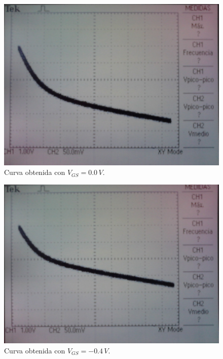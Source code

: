 \documentclass[10pt,spanish,a4paper,notitlepage]{article}
\begin{document}
\begin{figure}[H]
\centering
\includegraphics[scale=0.12]{mediciones/2_vgs0.jpg}
\caption{Curva obtenida con $V_{GS} = 0.0\,\unit{V}$.}
\label{fig:medicion_jfet_0}
\end{figure}

\begin{figure}[H]
\centering
\includegraphics[scale=0.12]{mediciones/2_vgs-04.jpg}
\caption{Curva obtenida con $V_{GS} = -0.4\,\unit{V}$.}
\label{fig:medicion_jfet_04}
\end{figure}
\end{document}
